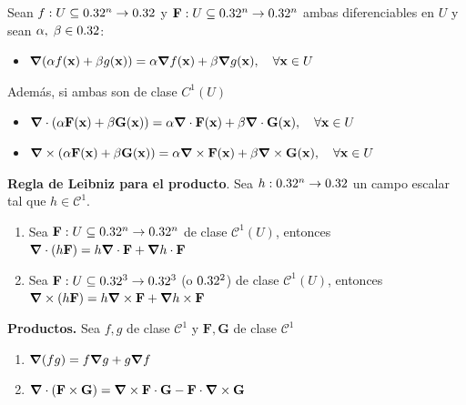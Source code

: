 \begin{propertie}
    Sean $f:U\subseteq0.32^n\to0.32$  y $\mathbf{F}:U\subseteq0.32^n\to0.32^n$  ambas diferenciables en $U$ y sean $\alpha,\;\beta\in0.32$:
    \begin{itemize}
        \item[1.] \(\grad(\alpha f(\mathbf{x})+\beta g(\mathbf{x}))=\alpha\grad f(\mathbf{x})+\beta\grad g(\mathbf{x}),\quad\forall\mathbf{x}\in U\) 
     \end{itemize}   
 
\:\:\:\:  Adem\'as, si ambas son de clase $C^{1}(U)$ 
       \begin{itemize}
        \item[2.]  \(\grad\cdot(\alpha \mathbf{F}(\mathbf{x})+\beta \mathbf{G}(\mathbf{x}))=\alpha\grad\cdot\mathbf{F}(\mathbf{x})+\beta\grad\cdot\mathbf{G}(\mathbf{x}),\quad\forall\mathbf{x}\in U\)
        \item[3.] \(\grad\times(\alpha \mathbf{F}(\mathbf{x})+\beta \mathbf{G}(\mathbf{x}))=\alpha\grad\times\mathbf{F}(\mathbf{x})+\beta\grad\times\mathbf{G}(\mathbf{x}),\quad\forall\mathbf{x}\in U\)
    \end{itemize}
\end{propertie}
\begin{propertie}
    \textbf{Regla de Leibniz para el producto}. Sea $h:0.32^n\to0.32$ un campo escalar tal que $h\in \mathcal{C}^1$.
    \begin{enumerate}
        \item Sea $\mathbf{F}:U\subseteq0.32^n\to0.32^n$ de clase $\mathcal{C}^1(U)$, entonces $\grad\cdot(h\mathbf{F})=h\grad\cdot\mathbf{F}+\grad h\cdot\mathbf{F}$
        \item Sea $\mathbf{F}:U\subseteq0.32^3\to0.32^3$ (o $0.32^2$) de clase $\mathcal{C}^1(U)$, entonces $\grad\times(h\mathbf{F})=h\grad\times\mathbf{F}+\grad h\times\mathbf{F}$
    \end{enumerate}
\end{propertie}
\begin{propertie}\textbf{Productos.} Sea $f,g$ de clase $\mathcal{C}^1$ y $\mathbf{F},\mathbf{G}$ de clase $\mathcal{C}^1$
    \begin{enumerate}
        \item $\grad(fg)=f\grad g+g\grad f$
        \item $\grad\cdot(\mathbf{F}\times\mathbf{G})=\grad\times\mathbf{F}\cdot\mathbf{G}-\mathbf{F}\cdot\grad\times\mathbf{G}$
    \end{enumerate}
\end{propertie}
